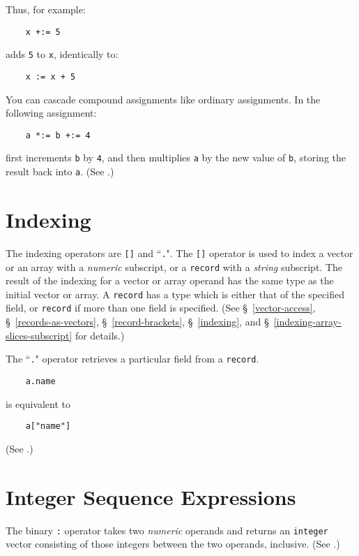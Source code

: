 Thus, for example:
\begin{verbatim}
    x +:= 5
\end{verbatim}
adds {\tt 5} to {\tt x}, identically to:
\begin{verbatim}
    x := x + 5
\end{verbatim}

You can cascade compound assignments like ordinary assignments.  In the
following assignment:
\begin{verbatim}
    a *:= b +:= 4
\end{verbatim}
first increments {\tt b} by {\tt 4}, and then multiplies {\tt a} by
the new value of {\tt b}, storing the result back into {\tt a}.
(See .)


\section{Indexing}

The indexing operators are
{\tt []}
and ``{\tt .}".
The {\tt []} operator
is used to index a vector or an 
array with a {\em numeric} 
subscript, or a {\tt record} with a {\em string} subscript.  The
result of the indexing for a vector or
array operand has the same type as the initial vector or array.
A {\tt record} has a  type which is either that of the 
specified field, or {\tt record}
if more than one field is specified.
(See \S~\ref{vector-access}, \S~\ref{records-as-vectors},
\S~\ref{record-brackets}, \S~\ref{indexing}, 
and \S~\ref{indexing-array-slices-subscript} for details.)

The ``{\tt .}" operator retrieves a particular field from a {\tt record}.
\begin{verbatim}
    a.name
\end{verbatim}
is equivalent to
\begin{verbatim}
    a["name"]
\end{verbatim}
(See .)

\section{Integer Sequence Expressions}

The binary {\tt :} operator
takes two {\em numeric} operands and returns
an {\tt integer} vector consisting of those integers between the two
operands, inclusive.  (See .)

